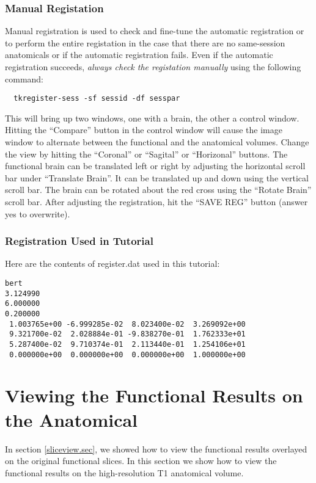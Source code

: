 \documentclass[12pt]{article}
\begin{document}
\subsubsection{Manual Registation}

Manual registration is used to check and fine-tune the automatic
registration or to perform the entire registation in the case that
there are no same-session anatomicals or if the automatic registration
fails. Even if the automatic registration succeeds, {\em always check
the registation manually} using the following command:
\begin{verbatim}
  tkregister-sess -sf sessid -df sesspar 
\end{verbatim}
This will bring up two windows, one with a brain, the other a control
window. Hitting the ``Compare'' button in the control window will
cause the image window to alternate between the functional and the
anatomical volumes. Change the view by hitting the ``Coronal'' or
``Sagital'' or ``Horizonal'' buttons. The functional brain can be
translated left or right by adjusting the horizontal scroll bar under
``Translate Brain''. It can be translated up and down using the
vertical scroll bar. The brain can be rotated about the red cross
using the ``Rotate Brain'' scroll bar. After adjusting the
registration, hit the ``SAVE REG'' button (answer yes to overwrite).

\subsubsection{Registration Used in Tutorial}

Here are the contents of register.dat used in this tutorial:
\begin{verbatim}
bert
3.124990
6.000000
0.200000
 1.003765e+00 -6.999285e-02  8.023400e-02  3.269092e+00 
 9.321700e-02  2.028884e-01 -9.838270e-01  1.762333e+01 
 5.287400e-02  9.710374e-01  2.113440e-01  1.254106e+01 
 0.000000e+00  0.000000e+00  0.000000e+00  1.000000e+00 
\end{verbatim}

\section{Viewing the Functional Results on the Anatomical}

In section \ref{sliceview.sec}, we showed how to view the functional
results overlayed on the original functional slices. In this section
we show how to view the functional results on the high-resolution T1
anatomical volume.
\end{document}
